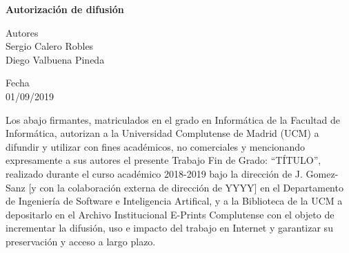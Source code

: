
\newpage

\thispagestyle{empty}

\begin{center}

{\bf \Huge Autorización de difusión}

\vspace{1cm}


   \large Autores\\
   \vspace{0.5cm}
    Sergio Calero Robles\\
    Diego Valbuena Pineda\\
   \vspace{0.5cm}


   Fecha\\
   01/09/2019

   \vspace{0.5cm}
   \end{center}
   
Los abajo firmantes, matriculados en el grado en Informática de la Facultad de Informática, autorizan a la Universidad Complutense de Madrid (UCM) a difundir y utilizar con fines académicos, no comerciales y mencionando expresamente a sus autores el presente Trabajo Fin de Grado: “TÍTULO”, realizado durante el curso académico 2018-2019 bajo la dirección de J. Gomez-Sanz [y con la colaboración externa de dirección de YYYY] en el Departamento de Ingeniería de Software e Inteligencia Artifical, y a la Biblioteca de la UCM a depositarlo en el Archivo Institucional E-Prints Complutense con el objeto de incrementar la difusión, uso e impacto del trabajo en Internet y garantizar su preservación y acceso a largo plazo.

